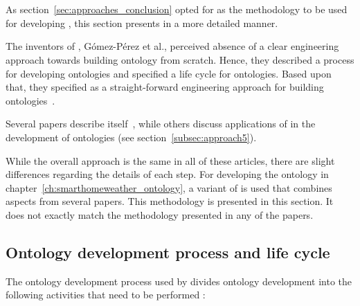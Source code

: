\section{\methontology}

As section~\ref{sec:approaches_conclusion} opted for \methontology as the methodology to be used for developing \smarthomeweather, this section presents \methontology in a more detailed manner.

\vspace{1em}

The inventors of \methontology, Gómez-Pérez et al., perceived absence of a clear engineering approach towards building ontology from scratch. Hence, they described a process for developing ontologies and specified a life cycle for ontologies. Based upon that, they specified \methontology as a straight-forward engineering approach for building ontologies~\cite{Methontology}.

Several papers describe \methontology itself~\cite{Methontology,Methontology2,ORSD}, while others discuss applications of \methontology in the development of ontologies (see section~\ref{subsec:approach5}).

While the overall approach is the same in all of these articles, there are slight differences regarding the details of each step. For developing the \smarthomeweather ontology in chapter~\ref{ch:smarthomeweather_ontology}, a variant of \methontology is used that combines aspects from several papers. This methodology is presented in this section. It does not exactly match the methodology presented in any of the papers.

\subsection{Ontology development process and life cycle}

The ontology development process used by \methontology divides ontology development into the following activities that need to be performed \cite{Methontology}:

